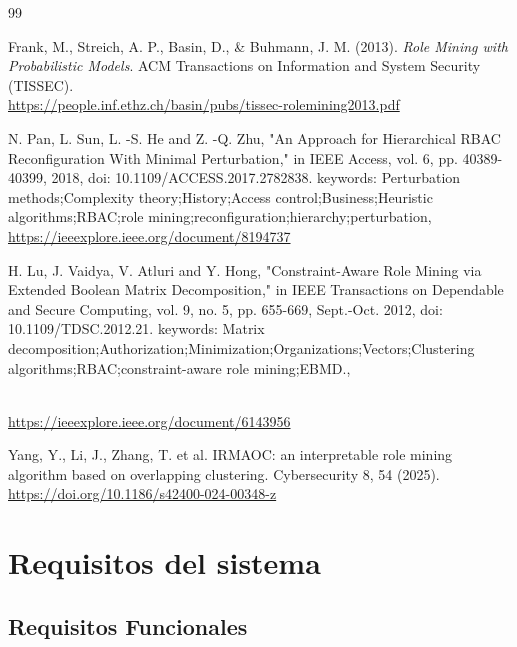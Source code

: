 \documentclass[11pt,letterpaper]{article}
\begin{document}
\begin{thebibliography}{99}

Frank, M., Streich, A. P., Basin, D., \& Buhmann, J. M. (2013). \textit{Role Mining with Probabilistic Models}. ACM Transactions on Information and System Security (TISSEC).\\
\url{https://people.inf.ethz.ch/basin/pubs/tissec-rolemining2013.pdf}

N. Pan, L. Sun, L. -S. He and Z. -Q. Zhu, "An Approach for Hierarchical RBAC Reconfiguration With Minimal Perturbation," in IEEE Access, vol. 6, pp. 40389-40399, 2018, doi: 10.1109/ACCESS.2017.2782838. keywords: {Perturbation methods;Complexity theory;History;Access control;Business;Heuristic algorithms;RBAC;role mining;reconfiguration;hierarchy;perturbation},
\url{https://ieeexplore.ieee.org/document/8194737}

H. Lu, J. Vaidya, V. Atluri and Y. Hong, "Constraint-Aware Role Mining via Extended Boolean Matrix Decomposition," in IEEE Transactions on Dependable and Secure Computing, vol. 9, no. 5, pp. 655-669, Sept.-Oct. 2012, doi: 10.1109/TDSC.2012.21.
keywords: {Matrix decomposition;Authorization;Minimization;Organizations;Vectors;Clustering algorithms;RBAC;constraint-aware role mining;EBMD.},

\\
\url{https://ieeexplore.ieee.org/document/6143956}

Yang, Y., Li, J., Zhang, T. et al. IRMAOC: an interpretable role mining algorithm based on overlapping clustering. Cybersecurity 8, 54 (2025).\\
\url{https://doi.org/10.1186/s42400-024-00348-z}

\end{thebibliography}


\section{Requisitos del sistema}
\label{rf}

\subsection{Requisitos Funcionales}
\end{document}

